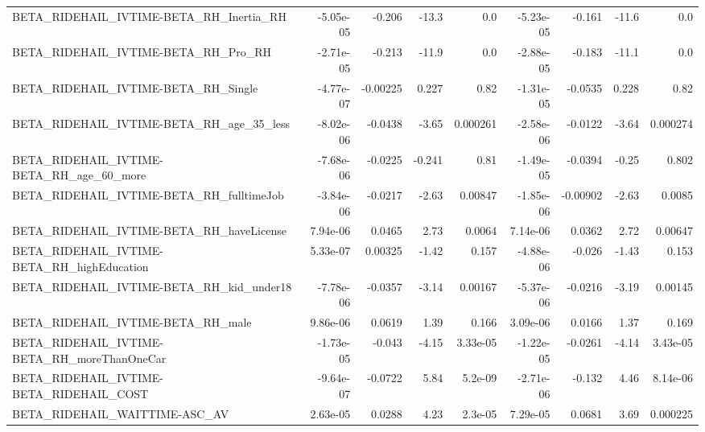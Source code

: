\begin{tabular}{lrrrrrrrr}
BETA\_RIDEHAIL\_IVTIME-BETA\_RH\_Inertia\_RH            &   -5.05e-05 &       -0.206 &    -13.3 &      0.0 &  -5.23e-05 &      -0.161 &        -11.6 &           0.0 \\
BETA\_RIDEHAIL\_IVTIME-BETA\_RH\_Pro\_RH                &   -2.71e-05 &       -0.213 &    -11.9 &      0.0 &  -2.88e-05 &      -0.183 &        -11.1 &           0.0 \\
BETA\_RIDEHAIL\_IVTIME-BETA\_RH\_Single                &   -4.77e-07 &     -0.00225 &    0.227 &     0.82 &  -1.31e-05 &     -0.0535 &        0.228 &          0.82 \\
BETA\_RIDEHAIL\_IVTIME-BETA\_RH\_age\_35\_less           &   -8.02e-06 &      -0.0438 &    -3.65 & 0.000261 &  -2.58e-06 &     -0.0122 &        -3.64 &      0.000274 \\
BETA\_RIDEHAIL\_IVTIME-BETA\_RH\_age\_60\_more           &   -7.68e-06 &      -0.0225 &   -0.241 &     0.81 &  -1.49e-05 &     -0.0394 &        -0.25 &         0.802 \\
BETA\_RIDEHAIL\_IVTIME-BETA\_RH\_fulltimeJob           &   -3.84e-06 &      -0.0217 &    -2.63 &  0.00847 &  -1.85e-06 &    -0.00902 &        -2.63 &        0.0085 \\
BETA\_RIDEHAIL\_IVTIME-BETA\_RH\_haveLicense           &    7.94e-06 &       0.0465 &     2.73 &   0.0064 &   7.14e-06 &      0.0362 &         2.72 &       0.00647 \\
BETA\_RIDEHAIL\_IVTIME-BETA\_RH\_highEducation         &    5.33e-07 &      0.00325 &    -1.42 &    0.157 &  -4.88e-06 &      -0.026 &        -1.43 &         0.153 \\
BETA\_RIDEHAIL\_IVTIME-BETA\_RH\_kid\_under18           &   -7.78e-06 &      -0.0357 &    -3.14 &  0.00167 &  -5.37e-06 &     -0.0216 &        -3.19 &       0.00145 \\
BETA\_RIDEHAIL\_IVTIME-BETA\_RH\_male                  &    9.86e-06 &       0.0619 &     1.39 &    0.166 &   3.09e-06 &      0.0166 &         1.37 &         0.169 \\
BETA\_RIDEHAIL\_IVTIME-BETA\_RH\_moreThanOneCar        &   -1.73e-05 &       -0.043 &    -4.15 & 3.33e-05 &  -1.22e-05 &     -0.0261 &        -4.14 &      3.43e-05 \\
BETA\_RIDEHAIL\_IVTIME-BETA\_RIDEHAIL\_COST            &   -9.64e-07 &      -0.0722 &     5.84 &  5.2e-09 &  -2.71e-06 &      -0.132 &         4.46 &      8.14e-06 \\
BETA\_RIDEHAIL\_WAITTIME-ASC\_AV                      &    2.63e-05 &       0.0288 &     4.23 &  2.3e-05 &   7.29e-05 &      0.0681 &         3.69 &      0.000225 \\

\end{tabular}
